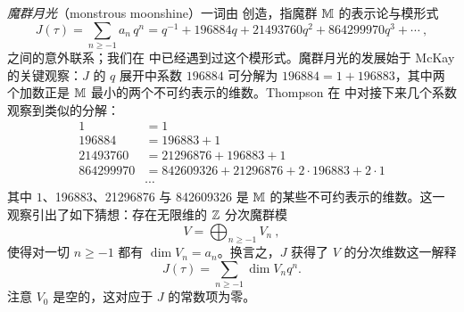 
\emph{魔群月光}（monstrous moonshine）一词由 \cite{conway_norton} 创造，指魔群 $\mathbb{M}$ 的表示论与模形式
\begin{equation}\label{Jcoeff}
J(\tau)=\sum_{n\geq-1}a_n \, q^n=q^{-1}+196884q+21493760q^2+864299970q^3+\cdots~,
\end{equation}
之间的意外联系；我们在  中已经遇到过这个模形式。魔群月光的发展始于 McKay 的关键观察：$J$ 的 $q$ 展开中系数 $196884$ 可分解为 $196884=1+196883$，其中两个加数正是 $\mathbb{M}$ 最小的两个不可约表示的维数。Thompson 在 \cite{Tho_NmrlgyMonsEllModFn} 中对接下来几个系数观察到类似的分解：
\begin{equation}
\label{eq:J_decomp}
\begin{split}
1&=1 \\
196884&=196883+1 \\
21493760&=21296876+196883+1 \\
864299970&=842609326+21296876+2\cdot196883+2\cdot1 \\
&\cdots 
\end{split}
\end{equation}
其中 $1$、196883、21296876 与 842609326 是 $\mathbb{M}$ 的某些不可约表示的维数。这一观察引出了如下猜想：存在无限维的 $\mathbb{Z}$ 分次魔群模
\begin{equation}
V=\bigoplus_{n\geq-1}V_n~,
\end{equation}
使得对一切 $n\geq-1$ 都有 $\dim V_n=a_n$。换言之，$J$ 获得了 $V$ 的分次维数这一解释
\begin{equation}
\label{eq:J_graded_trace}
J(\tau)=\sum_{n\geq-1}\dim V_n q^n.
\end{equation}
注意 $V_0$ 是空的，这对应于 $J$ 的常数项为零。



